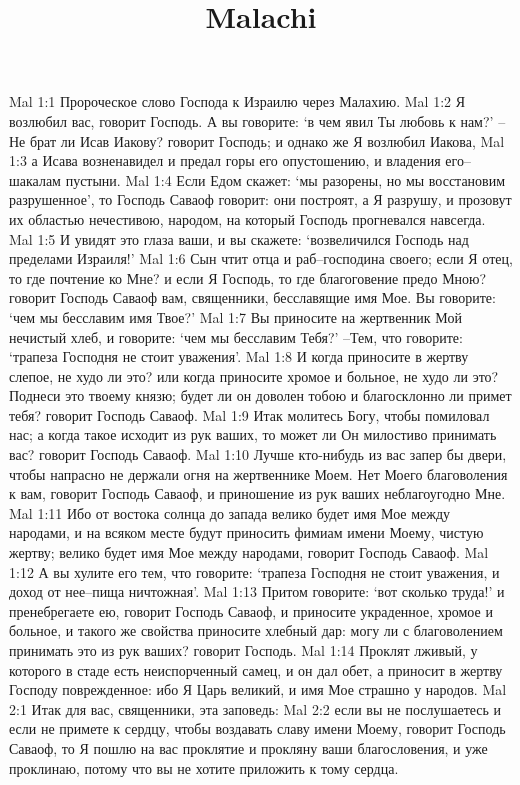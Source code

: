 

\title{Malachi}

Mal 1:1  Пророческое слово Господа к Израилю через Малахию.
Mal 1:2  Я возлюбил вас, говорит Господь. А вы говорите: `в чем явил Ты любовь к нам?' --Не брат ли Исав Иакову? говорит Господь; и однако же Я возлюбил Иакова,
Mal 1:3  а Исава возненавидел и предал горы его опустошению, и владения его--шакалам пустыни.
Mal 1:4  Если Едом скажет: `мы разорены, но мы восстановим разрушенное', то Господь Саваоф говорит: они построят, а Я разрушу, и прозовут их областью нечестивою, народом, на который Господь прогневался навсегда.
Mal 1:5  И увидят это глаза ваши, и вы скажете: `возвеличился Господь над пределами Израиля!'
Mal 1:6  Сын чтит отца и раб--господина своего; если Я отец, то где почтение ко Мне? и если Я Господь, то где благоговение предо Мною? говорит Господь Саваоф вам, священники, бесславящие имя Мое. Вы говорите: `чем мы бесславим имя Твое?'
Mal 1:7  Вы приносите на жертвенник Мой нечистый хлеб, и говорите: `чем мы бесславим Тебя?' --Тем, что говорите: `трапеза Господня не стоит уважения'.
Mal 1:8  И когда приносите в жертву слепое, не худо ли это? или когда приносите хромое и больное, не худо ли это? Поднеси это твоему князю; будет ли он доволен тобою и благосклонно ли примет тебя? говорит Господь Саваоф.
Mal 1:9  Итак молитесь Богу, чтобы помиловал нас; а когда такое исходит из рук ваших, то может ли Он милостиво принимать вас? говорит Господь Саваоф.
Mal 1:10  Лучше кто-нибудь из вас запер бы двери, чтобы напрасно не держали огня на жертвеннике Моем. Нет Моего благоволения к вам, говорит Господь Саваоф, и приношение из рук ваших неблагоугодно Мне.
Mal 1:11  Ибо от востока солнца до запада велико будет имя Мое между народами, и на всяком месте будут приносить фимиам имени Моему, чистую жертву; велико будет имя Мое между народами, говорит Господь Саваоф.
Mal 1:12  А вы хулите его тем, что говорите: `трапеза Господня не стоит уважения, и доход от нее--пища ничтожная'.
Mal 1:13  Притом говорите: `вот сколько труда!' и пренебрегаете ею, говорит Господь Саваоф, и приносите украденное, хромое и больное, и такого же свойства приносите хлебный дар: могу ли с благоволением принимать это из рук ваших? говорит Господь.
Mal 1:14  Проклят лживый, у которого в стаде есть неиспорченный самец, и он дал обет, а приносит в жертву Господу поврежденное: ибо Я Царь великий, и имя Мое страшно у народов.
Mal 2:1  Итак для вас, священники, эта заповедь:
Mal 2:2  если вы не послушаетесь и если не примете к сердцу, чтобы воздавать славу имени Моему, говорит Господь Саваоф, то Я пошлю на вас проклятие и прокляну ваши благословения, и уже проклинаю, потому что вы не хотите приложить к тому сердца.
